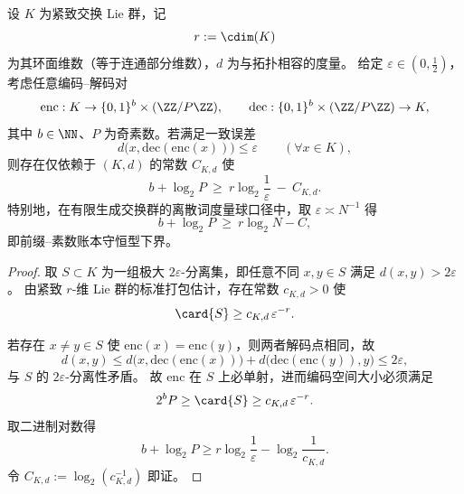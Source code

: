 \begin{theorem}[圆维--素数账本编码的一致误差信息下界]\label{thm:xi-time-part9c-cdim-prime-ledger-info-lb}
设 \(K\) 为紧致交换 Lie 群，记
\[
r:=\cdim(K)
\]
为其环面维数（等于连通部分维数），\(d\) 为与拓扑相容的度量。
给定 \(\varepsilon\in(0,\frac12)\)，考虑任意编码--解码对
\[
\mathrm{enc}:K\to\{0,1\}^b\times(\ZZ/P\ZZ),\qquad
\mathrm{dec}:\{0,1\}^b\times(\ZZ/P\ZZ)\to K,
\]
其中 \(b\in\NN\)、\(P\) 为奇素数。若满足一致误差
\[
d\bigl(x,\mathrm{dec}(\mathrm{enc}(x))\bigr)\le\varepsilon
\qquad(\forall x\in K),
\]
则存在仅依赖于 \((K,d)\) 的常数 \(C_{K,d}\) 使
\[
b+\log_2P\ \ge\ r\log_2\frac1\varepsilon\ -\ C_{K,d}.
\]
特别地，在有限生成交换群的离散词度量球口径中，取 \(\varepsilon\asymp N^{-1}\) 得
\[
b+\log_2P\ \ge\ r\log_2N-C,
\]
即前缀--素数账本守恒型下界。
\end{theorem}
\begin{proof}
取 \(S\subset K\) 为一组极大 \(2\varepsilon\)-分离集，即任意不同 \(x,y\in S\) 满足 \(d(x,y)>2\varepsilon\)。
由紧致 \(r\)-维 Lie 群的标准打包估计，存在常数 \(c_{K,d}>0\) 使
\[
\card{S}\ge c_{K,d}\,\varepsilon^{-r}.
\]

若存在 \(x\neq y\in S\) 使 \(\mathrm{enc}(x)=\mathrm{enc}(y)\)，则两者解码点相同，故
\[
d(x,y)
\le d\bigl(x,\mathrm{dec}(\mathrm{enc}(x))\bigr)
+d\bigl(\mathrm{dec}(\mathrm{enc}(y)),y\bigr)
\le 2\varepsilon,
\]
与 \(S\) 的 \(2\varepsilon\)-分离性矛盾。
故 \(\mathrm{enc}\) 在 \(S\) 上必单射，进而编码空间大小必须满足
\[
2^bP\ge \card{S}\ge c_{K,d}\,\varepsilon^{-r}.
\]
取二进制对数得
\[
b+\log_2P
\ge r\log_2\frac1\varepsilon-\log_2\frac1{c_{K,d}}.
\]
令 \(C_{K,d}:=\log_2(c_{K,d}^{-1})\) 即证。
\end{proof}
